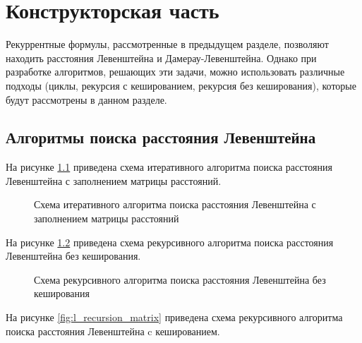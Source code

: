 \chapter{Конструкторская часть}

Рекуррентные формулы, рассмотренные в предыдущем разделе, позволяют находить расстояния Левенштейна и Дамерау-Левенштейна. Однако при разработке алгоритмов, решающих эти задачи, можно использовать различные подходы (циклы, рекурсия с кешированием, рекурсия без кеширования), которые будут рассмотрены в данном разделе.

\section{Алгоритмы поиска расстояния Левенштейна}

На рисунке \ref{fig:l_matrix} приведена схема итеративного алгоритма поиска расстояния Левенштейна с заполнением матрицы расстояний.

\begin{figure}[h!]
	
	
	\caption{Схема итеративного алгоритма поиска расстояния Левенштейна с заполнением матрицы расстояний}
	
	\label{fig:l_matrix}
	
\end{figure}


На рисунке \ref{fig:l_recursion_classic} приведена схема рекурсивного алгоритма поиска расстояния Левенштейна без кеширования.

\begin{figure}[h!]
	
		
	\caption{Схема рекурсивного алгоритма поиска расстояния Левенштейна без кеширования}
		
	\label{fig:l_recursion_classic}
		
\end{figure}


На рисунке \ref{fig:l_recursion_matrix} приведена схема рекурсивного алгоритма поиска расстояния Левенштейна c кешированием.

